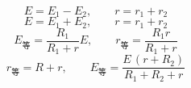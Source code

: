 \[ E=E_1-E_2,\qquad r=r_1+r_2 \]
\[ E=E_1+E_2,\qquad r=r_1+r_2 \]
\[ E_{\text{等}}=\frac{R_1}{R_1+r}E,\qquad r_{\text{等}}=\frac{R_1r}{R_1+r} \]
\[ r_{\text{等}}=R+r,\qquad E_{\text{等}}=\frac{E\,(r+R_2)}{R_1+R_2+r} \] %
